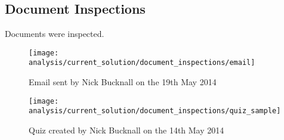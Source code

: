 \subsection{Document Inspections}

Documents were inspected.

\begin{figure}[h!]
  \texttt{[image: analysis/current\_solution/document\_inspections/email]}
  \caption{Email sent by Nick Bucknall on the 19th May 2014}
\end{figure}
\clearpage

\begin{figure}[h!]
  \texttt{[image: analysis/current\_solution/document\_inspections/quiz\_sample]}
  \caption{Quiz created by Nick Bucknall on the 14th May 2014}
\end{figure}
\clearpage
